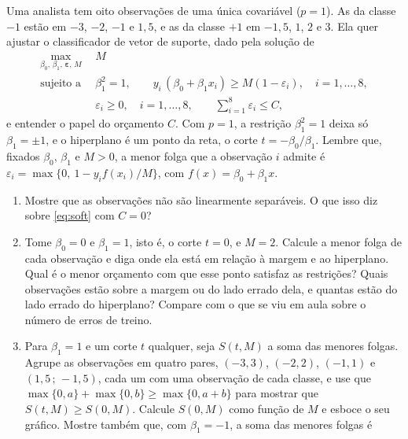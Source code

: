 \documentclass[11pt,a4paper]{article}
\begin{document}
\begin{exercicio}
Uma analista tem oito observações de uma única covariável ($p=1$). As da classe $-1$
estão em $-3$, $-2$, $-1$ e $1{,}5$, e as da classe $+1$ em $-1{,}5$, $1$, $2$ e $3$.
Ela quer ajustar o classificador de vetor de suporte, dado pela solução de
\begin{equation}\label{eq:soft}
\begin{aligned}
  \max_{\beta_0,\,\beta_1,\,\bm\varepsilon,\,M}\ \ & M\\
  \text{sujeito a}\ \ & \beta_1^2=1,\qquad
     y_i\,(\beta_0+\beta_1x_i)\ge M(1-\varepsilon_i),\quad i=1,\dots,8,\\
  & \varepsilon_i\ge0,\quad i=1,\dots,8,\qquad \textstyle\sum_{i=1}^8\varepsilon_i\le C,
\end{aligned}
\end{equation}
e entender o papel do orçamento $C$. Com $p=1$, a restrição $\beta_1^2=1$ deixa
só $\beta_1=\pm1$, e o hiperplano é um ponto da reta, o corte $t=-\beta_0/\beta_1$.
Lembre que, fixados $\beta_0$, $\beta_1$ e $M>0$, a menor folga que a observação $i$
admite é $\varepsilon_i=\max\{0,\ 1-y_if(x_i)/M\}$, com $f(x)=\beta_0+\beta_1x$.
\begin{enumerate}[label=(\alph*),leftmargin=1.1cm]
  \item Mostre que as observações não são linearmente separáveis. O que isso diz sobre
        \eqref{eq:soft} com $C=0$?
  \item Tome $\beta_0=0$ e $\beta_1=1$, isto é, o corte $t=0$, e $M=2$. Calcule a menor
        folga de cada observação e diga onde ela está em relação à margem e ao
        hiperplano. Qual é o menor orçamento com que esse ponto satisfaz as
        restrições? Quais observações estão sobre a margem ou do lado errado dela, e
        quantas estão do lado errado do hiperplano? Compare com o que se viu em aula
        sobre o número de erros de treino.
  \item Para $\beta_1=1$ e um corte $t$ qualquer, seja $S(t,M)$ a soma das menores
        folgas. Agrupe as observações em quatro pares, $(-3,3)$, $(-2,2)$, $(-1,1)$ e
        $(1{,}5\,;\,-1{,}5)$, cada um com uma observação de cada classe, e use que
        $\max\{0,a\}+\max\{0,b\}\ge\max\{0,a+b\}$ para mostrar que
        $S(t,M)\ge S(0,M)$. Calcule $S(0,M)$ como função de $M$ e esboce o seu
        gráfico. Mostre também que, com $\beta_1=-1$, a soma das menores folgas é

\end{enumerate}
\end{exercicio}
\end{document}
